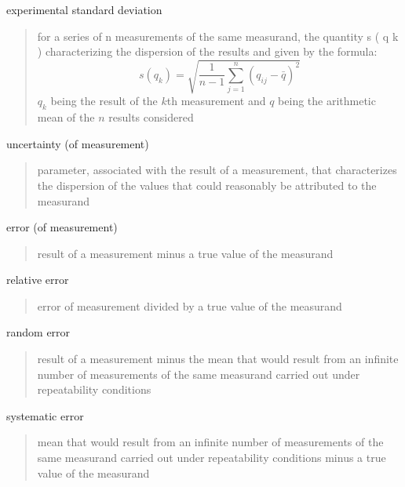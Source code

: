 \documentclass[avery5371,grid]{flashcards}
\begin{document}
\begin{flashcard}[Defintion]{experimental standard deviation}
\hfill\vfill
\begin{quote}
    for a series of n measurements of the same measurand, the quantity s ( q k ) characterizing the dispersion of the results and given by the formula:
    \begin{equation}
        s(q_k) = \sqrt{ \frac{1}{n-1} \sum_{j=1}^{n} \left( q_{ij} - \bar{q} \right)^2 }
    \end{equation}
    $q_k$ being the result of the $k$th measurement and $q$ being the arithmetic mean of the $n$ results considered
\end{quote}
\vfill
\end{flashcard}

\begin{flashcard}[Defintion]{uncertainty (of measurement)}
\hfill\vfill
\begin{quote}
    parameter, associated with the result of a measurement, that characterizes the dispersion of the values that could reasonably be attributed to the measurand
\end{quote}
\vfill
\end{flashcard}

\begin{flashcard}[Defintion]{error (of measurement)}
\hfill\vfill
\begin{quote}
    result of a measurement minus a true value of the measurand
\end{quote}
\vfill
\end{flashcard}

\begin{flashcard}[Defintion]{relative error}
\hfill\vfill
\begin{quote}
    error of measurement divided by a true value of the measurand
\end{quote}
\vfill
\end{flashcard}

\begin{flashcard}[Defintion]{random error}
\hfill\vfill
\begin{quote}
    result of a measurement minus the mean that would result from an infinite number of measurements of the same measurand carried out under repeatability conditions
\end{quote}
\vfill
\end{flashcard}

\begin{flashcard}[Defintion]{systematic error}
\hfill\vfill
\begin{quote}
    mean that would result from an infinite number of measurements of the same measurand carried out under repeatability conditions minus a true value of the measurand
\end{quote}
\vfill
\end{flashcard}
\end{document}
